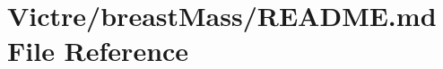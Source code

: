 \hypertarget{Victre_2breastMass_2README_8md}{\section{Victre/breast\-Mass/\-R\-E\-A\-D\-M\-E.md File Reference}
\label{Victre_2breastMass_2README_8md}
}
